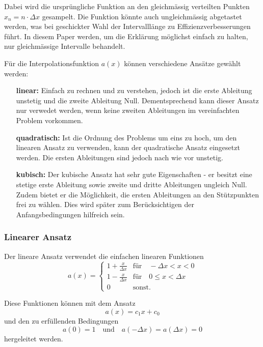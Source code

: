 Dabei wird die ursprüngliche Funktion an den gleichmässig verteilten Punkten $x_n = n \cdot \Delta x$ gesampelt. 
Die Funktion könnte auch ungleichmässig abgetastet werden, was bei geschickter Wahl der Intervalllänge zu Effizienzverbesserungen führt.
In diesem Paper werden, um die Erklärung möglichst einfach zu halten, nur gleichmässige Intervalle behandelt. 

Für die Interpolationsfunktion $a(x)$ können verschiedene Ansätze gewählt werden:
\begin{itemize}
    \item[\textbf{linear:}] 
        Einfach zu rechnen und zu verstehen, jedoch ist die erste Ableitung unstetig und die zweite Ableitung Null.
        Dementsprechend kann dieser Ansatz nur verwedet werden, wenn keine zweiten Ableitungen im vereinfachten Problem vorkommen.
    \item[\textbf{quadratisch:}]
        Ist die Ordnung des Problems um eins zu hoch, um den linearen Ansatz zu verwenden, kann der quadratische Ansatz eingesetzt werden.
        Die ersten Ableitungen sind jedoch nach wie vor unstetig.
    \item[\textbf{kubisch:}]  
        Der kubische Ansatz hat sehr gute Eigenschaften - er besitzt eine stetige erste Ableitung sowie zweite und dritte Ableitungen ungleich Null. 
        Zudem bietet er die Möglichkeit, die ersten Ableitungen an den Stützpunkten frei zu wählen.
        Dies wird später zum Berücksichtigen der Anfangsbedingungen hilfreich sein.
\end{itemize}

\subsubsection{Linearer Ansatz}
Der lineare Ansatz verwendet die einfachen linearen Funktionen
\begin{equation}
    a(x) = \left\{ \begin{array}{ll}
        1+\frac{x}{\Delta x} & \text{für} \quad -\Delta x < x < 0 \\
        1-\frac{x}{\Delta x} & \text{für} \quad 0 \leq x < \Delta x \\
        0                    & \text{sonst}.
    \end{array} \right.
\end{equation}

Diese Funktionen können mit dem Ansatz 
\begin{equation}
    a(x) = c_1x + c_0 %
\end{equation}
und den zu erfüllenden Bedingungen
\begin{equation}
        a(0) = 1 \quad
        \text{und} \quad
        a(-\Delta x) = a(\Delta x) = 0
\end{equation}
hergeleitet werden.

